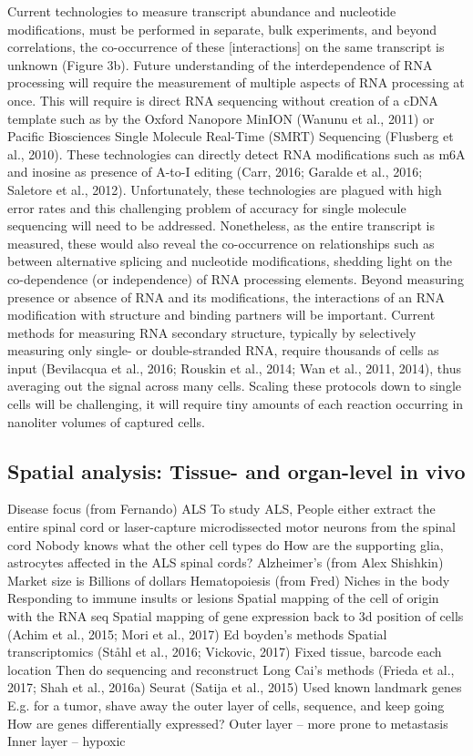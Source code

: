 Current technologies to measure transcript abundance and nucleotide modifications, must be performed in separate, bulk experiments, and beyond correlations, the co-occurrence of these [interactions] on the same transcript is unknown (Figure 3b). Future understanding of the interdependence of RNA processing will require the measurement of multiple aspects of RNA processing at once. This will require is direct RNA sequencing without creation of a cDNA template such as by the Oxford Nanopore MinION (Wanunu et al., 2011) or Pacific Biosciences Single Molecule Real-Time (SMRT) Sequencing (Flusberg et al., 2010). These technologies can directly detect RNA modifications such as m6A and inosine as presence of A-to-I editing (Carr, 2016; Garalde et al., 2016; Saletore et al., 2012). Unfortunately, these technologies are plagued with high error rates and this challenging problem of accuracy for single molecule sequencing will need to be addressed. Nonetheless, as the entire transcript is measured, these would also reveal the co-occurrence on relationships such as between alternative splicing and nucleotide modifications, shedding light on the co-dependence (or independence) of RNA processing elements.
Beyond measuring presence or absence of RNA and its modifications, the interactions of an RNA modification with structure and binding partners will be important. Current methods for measuring RNA secondary structure, typically by selectively measuring only single- or double-stranded RNA, require thousands of cells as input (Bevilacqua et al., 2016; Rouskin et al., 2014; Wan et al., 2011, 2014), thus averaging out the signal across many cells. Scaling these protocols down to single cells will be challenging, it will require tiny amounts of each reaction occurring in nanoliter volumes of captured cells.

\subsection{Spatial analysis: Tissue- and organ-level in vivo}

Disease focus (from Fernando)
ALS
To study ALS, People either extract the entire spinal cord or laser-capture microdissected motor neurons from the spinal cord
Nobody knows what the other cell types do 
How are the supporting glia, astrocytes affected in the ALS spinal cords?
Alzheimer’s (from Alex Shishkin)
Market size is Billions of dollars
Hematopoiesis (from Fred)
Niches in the body
Responding to immune insults or lesions
Spatial mapping of the cell of origin with the RNA seq
Spatial mapping of gene expression back to 3d position of cells (Achim et al., 2015; Mori et al., 2017)
Ed boyden’s methods
Spatial transcriptomics (Ståhl et al., 2016; Vickovic, 2017) 
Fixed tissue, barcode each location
Then do sequencing and reconstruct
Long Cai’s methods (Frieda et al., 2017; Shah et al., 2016a)
Seurat (Satija et al., 2015)
Used known landmark genes
E.g. for a tumor, shave away the outer layer of cells, sequence, and keep going
How are genes differentially expressed?
Outer layer -- more prone to metastasis
Inner layer -- hypoxic

